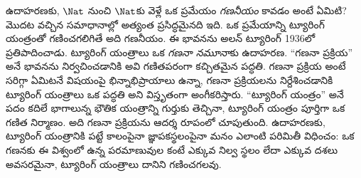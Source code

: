 \documentclass[../../../include/open-logic-section]{subfiles}
\begin{document}

ఉదాహరణకు, $\Nat$ నుంచి $\Nat$కు వెళ్లే ఒక ప్రమేయం
\emph{గణనీయం} కావడం అంటే ఏమిటి? మొదట వచ్చిన సమాధానాల్లో అత్యంత
ప్రసిద్ధమైనది ఇది. ఒక ప్రమేయాన్ని ట్యూరింగ్ యంత్రంతో గణించగలిగితే
అది గణనీయం. ఈ భావనను అలన్ ట్యూరింగ్ 1936లో ప్రతిపాదించాడు. ట్యూరింగ్
యంత్రాలు ఒక \emph{గణనా నమూనా}కు ఉదాహరణ. ``గణనా ప్రక్రియ'' అనే భావనను
నిర్వచించడానికి అవి గణితపరంగా కచ్చితమైన పద్ధతి. గణనా ప్రక్రియ అంటే సరిగ్గా ఏమిటనే
విషయంపై భిన్నాభిప్రాయాలు ఉన్నా, గణనా ప్రక్రియలను నిర్దేశించడానికి ట్యూరింగ్
యంత్రాలు ఒక పద్ధతి అని విస్తృతంగా అంగీకరిస్తారు. ``ట్యూరింగ్ యంత్రం'' అనే పదం
కదిలే భాగాలున్న భౌతిక యంత్రాన్ని గుర్తుకు తెచ్చినా, ట్యూరింగ్ యంత్రం
పూర్తిగా ఒక గణిత నిర్మాణం. అది గణనా ప్రక్రియను ఆదర్శ రూపంలో చూపుతుంది. ఉదాహరణకు, ట్యూరింగ్ యంత్రానికి పట్టే
కాలంపైనా జ్ఞాపకస్థలంపైనా మనం ఎలాంటి పరిమితీ విధించం: ఒక గణనకు ఈ విశ్వంలో
ఉన్న పరమాణువుల కంటే ఎక్కువ నిల్వ స్థలం లేదా ఎక్కువ దశలు అవసరమైనా, ట్యూరింగ్
యంత్రాలు దానిని గణించగలవు.
\end{document}
